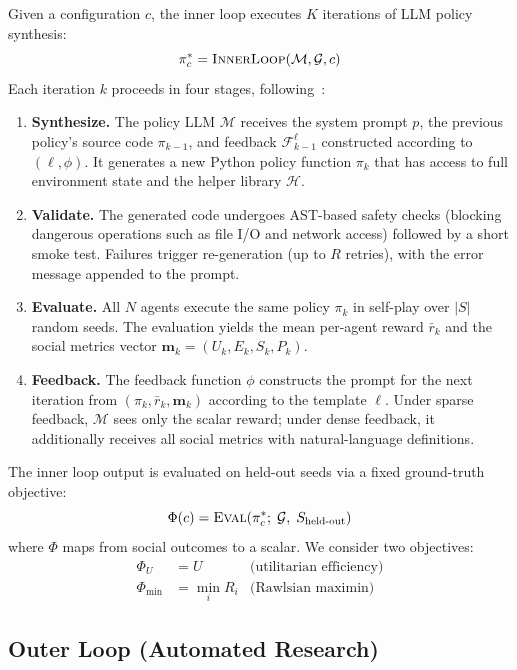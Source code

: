\documentclass[10pt,twocolumn]{article}
\newcommand{\cM}{\mathcal{M}}
\newcommand{\cG}{\mathcal{G}}
\newcommand{\bm}{\mathbf{m}}
\begin{document}
Given a configuration $c$, the inner loop executes $K$ iterations of LLM policy synthesis:
\begin{equation}
  \pi^*_c = \textsc{InnerLoop}(\cM, \cG, c)
\end{equation}
Each iteration $k$ proceeds in four stages, following~\cite{gallego2026}:
\begin{enumerate}
  \item \textbf{Synthesize.} The policy LLM $\cM$ receives the system prompt $p$, the previous policy's source code $\pi_{k-1}$, and feedback $\mathcal{F}_{k-1}^\ell$ constructed according to $(\ell, \phi)$. It generates a new Python policy function $\pi_k$ that has access to full environment state and the helper library $\mathcal{H}$.
  \item \textbf{Validate.} The generated code undergoes AST-based safety checks (blocking dangerous operations such as file I/O and network access) followed by a short smoke test. Failures trigger re-generation (up to $R$ retries), with the error message appended to the prompt.
  \item \textbf{Evaluate.} All $N$ agents execute the same policy $\pi_k$ in self-play over $|S|$ random seeds. The evaluation yields the mean per-agent reward $\bar{r}_k$ and the social metrics vector $\bm_k = (U_k, E_k, S_k, P_k)$.
  \item \textbf{Feedback.} The feedback function $\phi$ constructs the prompt for the next iteration from $(\pi_k, \bar{r}_k, \bm_k)$ according to the template $\ell$. Under sparse feedback, $\cM$ sees only the scalar reward; under dense feedback, it additionally receives all social metrics with natural-language definitions.
\end{enumerate}

The inner loop output is evaluated on held-out seeds via a fixed ground-truth objective:
\begin{equation}
  \Phi(c) = \textsc{Eval}(\pi^*_c;\; \cG,\; S_{\text{held-out}})
  \label{eq:phi}
\end{equation}
where $\Phi$ maps from social outcomes to a scalar. We consider two objectives:
\begin{align}
  \Phi_U &= U & \text{(utilitarian efficiency)} \label{eq:eff}\\
  \Phi_{\min} &= \min_i R_i & \text{(Rawlsian maximin)} \label{eq:rawls}
\end{align}

\subsection{Outer Loop (Automated Research)}
\end{document}
